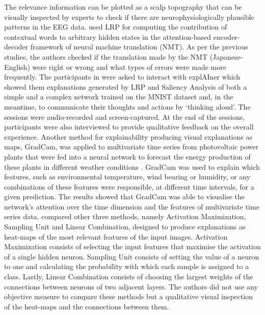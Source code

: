 \documentclass[final,1p,times]{elsarticle}
\begin{document}
The relevance information can be plotted as a scalp topography that can be visually inspected by experts to check if there are neurophysiologically plausible patterns in the EEG data. 
\cite{ding2017visualizing} used LRP for computing the contribution of contextual words to arbitrary hidden states in the attention-based encoder-decoder framework of neural machine translation (NMT).
As per the previous studies, the authors checked if the translation made by the NMT (Japanese-English) were right or wrong and what types of errors were made more frequently.
The participants in \cite{spinner2019explainer} were asked to interact with explAIner which showed them explanations generated by LRP and Saliency Analysis of both a simple and a complex network trained on the MNIST dataset and, in the meantime, to communicate their thoughts and actions by `thinking aloud'. The sessions were audio-recorded and screen-captured. At the end of the sessions, participants were also interviewed to provide qualitative feedback on the overall experience.
Another method for explainability producing visual explanations as maps, GradCam, was applied to multivariate time series from photovoltaic power plants that were fed into a neural network to forecast the energy production of these plants in different weather conditions \cite{assaf2019explainable}. GradCam was used to explain which features, such as environmental temperature, wind bearing or humidity, or any combinations of these features were responsible, at different time intervals, for a given prediction. The results showed that GradCam was able to visualise the network’s attention over the time dimension and the features of multivariate time series data.
\cite{erhan2009visualizing} compared other three methods, namely Activation Maximization, Sampling Unit and Linear Combination, designed to produce explanations as heat-maps of the most relevant features of the input images. Activation Maximization consists of selecting the input features that maximise the activation of a single hidden neuron. Sampling Unit consists of setting the value of a neuron to one and calculating the probability with which each sample is assigned to a class. Lastly, Linear Combination consists of choosing the largest weights of the connections between neurons of two adjacent layers. The authors did not use any objective measure to compare these methods but  a qualitative visual inspection of the heat-maps and  the connections between  them.
\end{document}
